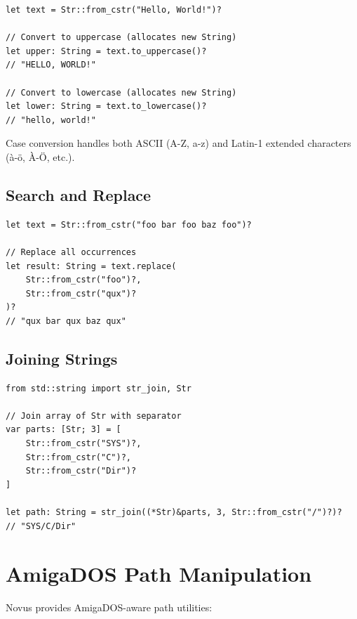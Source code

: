 \begin{lstlisting}
let text = Str::from_cstr("Hello, World!")?

// Convert to uppercase (allocates new String)
let upper: String = text.to_uppercase()?
// "HELLO, WORLD!"

// Convert to lowercase (allocates new String)
let lower: String = text.to_lowercase()?
// "hello, world!"
\end{lstlisting}

Case conversion handles both ASCII (A-Z, a-z) and Latin-1 extended characters (\`{a}-\"{o}, \`{A}-\"{O}, etc.).

\subsection{Search and Replace}

\begin{lstlisting}
let text = Str::from_cstr("foo bar foo baz foo")?

// Replace all occurrences
let result: String = text.replace(
    Str::from_cstr("foo")?,
    Str::from_cstr("qux")?
)?
// "qux bar qux baz qux"
\end{lstlisting}

\subsection{Joining Strings}

\begin{lstlisting}
from std::string import str_join, Str

// Join array of Str with separator
var parts: [Str; 3] = [
    Str::from_cstr("SYS")?,
    Str::from_cstr("C")?,
    Str::from_cstr("Dir")?
]

let path: String = str_join((*Str)&parts, 3, Str::from_cstr("/")?)?
// "SYS/C/Dir"
\end{lstlisting}

\section{AmigaDOS Path Manipulation}
\label{sec:path-manipulation}

Novus provides AmigaDOS-aware path utilities:

